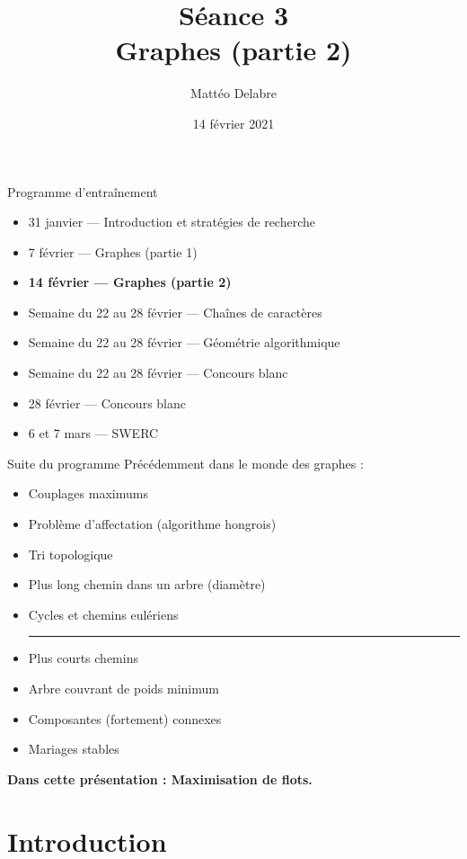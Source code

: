\documentclass{main}
\title{\textbf{Séance 3}\\Graphes (partie 2)}
\institute{Université de Montpellier}
\author{Mattéo Delabre}
\date{14 février 2021}
\begin{document}
\begin{frame}{Programme d’entraînement}
    \begin{itemize}
        \item 31 janvier --- Introduction et stratégies de recherche
        \item 7 février --- Graphes (partie 1)
        \item \textbf{14 février --- Graphes (partie 2)}
        \item Semaine du 22 au 28 février --- Chaînes de caractères
        \item Semaine du 22 au 28 février --- Géométrie algorithmique
        \item Semaine du 22 au 28 février --- Concours blanc
        \item 28 février --- Concours blanc
        \item 6 et 7 mars --- SWERC
    \end{itemize}
\end{frame}

\maketitle

\begin{frame}{Suite du programme}
    Précédemment dans le monde des graphes :\begin{itemize}
        \item Couplages maximums
        \item Problème d’affectation (algorithme hongrois)
        \item Tri topologique
        \item Plus long chemin dans un arbre (diamètre)
        \item Cycles et chemins eulériens
        \vspace{8pt}
        \hrule
        \vspace{8pt}
        \item Plus courts chemins
        \item Arbre couvrant de poids minimum
        \item Composantes (fortement) connexes
        \item Mariages stables
    \end{itemize}
    
    \textbf{Dans cette présentation : Maximisation de flots.}
\end{frame}

\section{Introduction}
\maketoc
\end{document}
